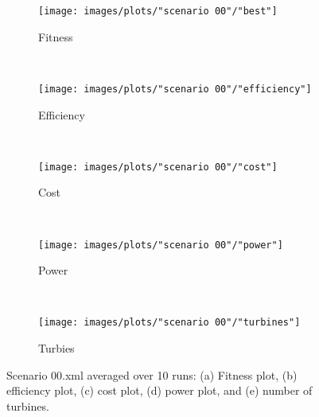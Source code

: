 \begin{figure}[h!]
    \centering
      \begin{subfigure}[b]{0.31\textwidth}
        \texttt{[image: images/plots/"scenario 00"/"best"]}
        \caption{Fitness}
        \hfill
        \label{plot:master slave model fitness plot scenario 00}
    \end{subfigure}
    ~
      \begin{subfigure}[b]{0.31\textwidth}
        \texttt{[image: images/plots/"scenario 00"/"efficiency"]}
        \caption{Efficiency}
        \hfill
        \label{plot:single point crossover}
    \end{subfigure}
    ~
    \begin{subfigure}[b]{0.31\textwidth}
        \texttt{[image: images/plots/"scenario 00"/"cost"]}
        \caption{Cost}
        \hfill
        \label{plot:single point crossover}
    \end{subfigure}
    ~
    \begin{subfigure}[b]{0.31\textwidth}
        \texttt{[image: images/plots/"scenario 00"/"power"]}
        \caption{Power}
        \hfill
        \label{plot:two point crossover}
    \end{subfigure}
    ~
    \begin{subfigure}[b]{0.31\textwidth}
        \texttt{[image: images/plots/"scenario 00"/"turbines"]}
        \caption{Turbies}
        \hfill
        \label{plot:uniform crossover}
    \end{subfigure}
    \caption{Scenario 00.xml averaged over 10 runs: (a) Fitness plot, (b) efficiency plot, (c) cost plot, (d) power plot, and (e) number of turbines.}
    \label{plot:master slave scenario 00}
\end{figure}


